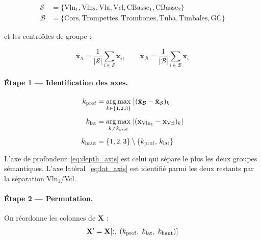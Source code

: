 \documentclass[12pt, a4paper]{article}
\theoremstyle{plain}
\theoremstyle{definition}
\newcommand{\mat}[1]{\mathbf{#1}}
\newcommand{\vect}[1]{\mathbf{#1}}
\begin{document}
\begin{align*}
    \mathcal{S} &= \{\text{Vln}_1, \text{Vln}_2, \text{Vla}, \text{Vcl},
                     \text{CBasse}_1, \text{CBasse}_2\} \\
    \mathcal{B} &= \{\text{Cors}, \text{Trompettes}, \text{Trombones},
                     \text{Tuba}, \text{Timbales}, \text{GC}\}
\end{align*}

et les centroïdes de groupe :

\begin{equation}
    \bar{\vect{x}}_{\mathcal{S}} = \frac{1}{|\mathcal{S}|}
    \sum_{i \in \mathcal{S}} \vect{x}_i,
    \qquad
    \bar{\vect{x}}_{\mathcal{B}} = \frac{1}{|\mathcal{B}|}
    \sum_{i \in \mathcal{B}} \vect{x}_i
\end{equation}

\paragraph{Étape 1 — Identification des axes.}

\begin{align}
    k_{\rm prof}   &= \underset{k \in \{1,2,3\}}{\arg\max}\;
                      \bigl|(\bar{\vect{x}}_{\mathcal{B}}
                           - \bar{\vect{x}}_{\mathcal{S}})_k\bigr|
    \label{eq:depth_axis}\\[4pt]
    k_{\rm lat}    &= \underset{k \neq k_{\rm prof}}{\arg\max}\;
                      |(\vect{x}_{\text{Vln}_1} - \vect{x}_{\text{Vcl}})_k|
    \label{eq:lat_axis}\\[4pt]
    k_{\rm haut}   &= \{1,2,3\} \setminus \{k_{\rm prof},\, k_{\rm lat}\}
    \label{eq:height_axis}
\end{align}

L'axe de profondeur~\eqref{eq:depth_axis} est celui qui sépare le plus les
deux groupes sémantiques.  L'axe latéral~\eqref{eq:lat_axis} est identifié
parmi les deux restants par la séparation Vln$_1$/Vcl.

\paragraph{Étape 2 — Permutation.}

On réordonne les colonnes de $\mat{X}$ :
\begin{equation}
    \mat{X}' = \mat{X}[:,\; (k_{\rm prof},\; k_{\rm lat},\; k_{\rm haut})]
\end{equation}
\end{document}
